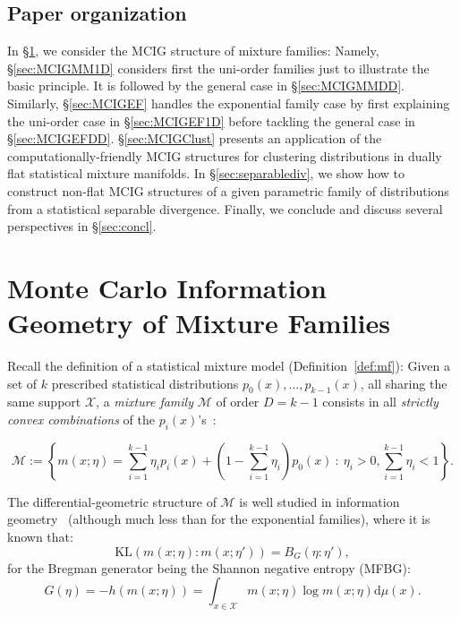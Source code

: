 \documentclass[graybox]{svmult}
\def\dmu{\mathrm{d}\mu}
\def\KL{\mathrm{KL}}
\def\eqdef{:=}
\def\calX{\mathcal{X}}
\def\calM{\mathcal{M}}
\def\st{{\ :\ }}
\begin{document}
 
\subsection{Paper organization}
In \S\ref{sec:MCIGMF}, we consider the MCIG structure of mixture families: 
Namely, \S\ref{sec:MCIGMM1D} considers first the uni-order families just to illustrate the basic principle. 
It is followed by the general case in \S\ref{sec:MCIGMMDD}.
Similarly, \S\ref{sec:MCIGEF} handles the exponential family case by first explaining the uni-order case in \S\ref{sec:MCIGEF1D} before tackling the general case in \S\ref{sec:MCIGEFDD}.
\S\ref{sec:MCIGClust} presents an application of the computationally-friendly MCIG structures for clustering distributions in dually flat statistical  mixture manifolds.
In \S\ref{sec:separablediv}, we show how to construct non-flat MCIG structures of a given parametric family of distributions from a statistical separable divergence.
Finally, we conclude and discuss several perspectives in \S\ref{sec:concl}.



\section{Monte Carlo Information Geometry of Mixture Families}\label{sec:MCIGMF}


Recall the definition  of a statistical mixture model (Definition~\ref{def:mf}):
Given a set of $k$ prescribed statistical distributions $p_0(x),\ldots, p_{k-1}(x)$, all sharing the same support $\calX$, a
 {\em mixture family} $\calM$ of order $D=k-1$ consists in all {\em strictly convex combinations} of the $p_i(x)$'s~\cite{wmixture-2017}:

\begin{equation}
\calM \eqdef  \left\{ m(x;\eta)= \sum_{i=1}^{k-1} \eta_ip_i(x)+ (1-\sum_{i=1}^{k-1} \eta_i)p_0(x) \st \eta_i>0, \sum_{i=1}^{k-1} \eta_i<1 \right\}.
\end{equation}

The differential-geometric structure of $\calM$ is well studied in information geometry~\cite{IG-2014,IG-2016} (although much less than for the exponential families), where it is known that:
\begin{equation}
\KL(m(x;\eta):m(x;\eta')) = B_G(\eta:\eta'),
\end{equation}
for the Bregman generator being the Shannon negative entropy (MFBG):
\begin{equation} 
G(\eta)=-h(m(x;\eta))=\int_{x\in\calX} m(x;\eta)\log m(x;\eta) \dmu(x).
\end{equation}
 
\end{document}
